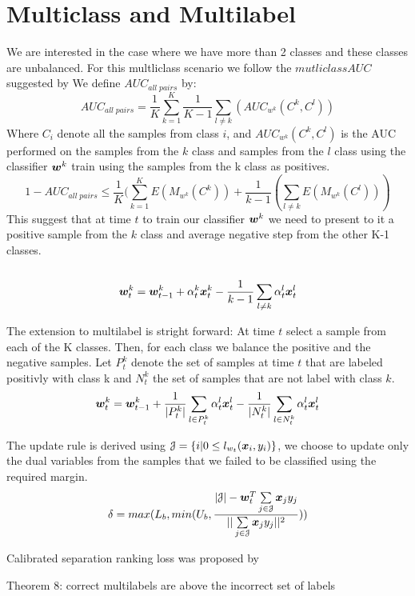 \section{Multiclass and  Multilabel }

We are interested in the case where we have more than 2 classes and these classes are unbalanced. For this multliclass scenario we follow the $mutliclass AUC$ suggested by \cite{Hand2001}  
We define $AUC_{all \; pairs}$ by:
\[
	AUC_{all \; pairs} = \frac{1}{K} \sum\limits_{k=1}^{K}  \frac{1}{K-1}\sum\limits_{l \neq k} (AUC_{w^k}(C^k, C^l)) 
\]
Where $C_i$ denote all the samples from class $i$, and $AUC_{w^k}(C^k, C^l)$ is the AUC performed on the samples from the $k$ class and samples from the $l$ class using the classifier $ \bm{w}^k $ train using the samples from the k class as positives.
\[
1 - AUC_{all \; pairs} \leq \frac{1}{K} ( \sum\limits_{k=1}^{K} E(M_{w^k}(C^k)) + \frac{1}{k-1} ( \sum\limits_{l \neq k}  E(M_{w^k}(C^l)) )
\]
This suggest that at time $t$ to train our classifier $\bm{w}^k $ we need to present to it a positive sample from the $k$ class and average negative step from the other K-1 classes.\\
\\
\[
  \bm{w}^k_t = \bm{w}^k_{t-1} + \alpha^k_t \bm{x}^k_t - \frac{1}{k-1}\sum\limits_{l \neq k} \alpha^l_t \bm{x}^l_t
\]

The extension to multilabel is stright forward: At time $t$ select a sample from each of the K classes. Then, for each class we balance the positive and the negative samples. Let $P^k_t$ denote the set of samples at time $t$ that are labeled positivly with class k and $N^k_t$ the set of samples that are not label with class $k$.
\\
\[
  \bm{w}^k_t = \bm{w}^k_{t-1} + \frac{1}{|P^k_t|} \sum\limits_{l \in P^k_t} \alpha^l_t \bm{x}^l_t - \frac{1}{|N^k_t|}\sum\limits_{l \in N^k_t} \alpha^l_t \bm{x}^l_t
\]

The update rule is derived using $\mathcal{J} = \{ i | 0 \leq l_{w_t}(\bm{x}_i, y_i) \}$, we choose to update only the dual variables from the samples that we failed to be classified using the required margin.
\\

\[ \delta = max(L_b   , min(U_b , \frac{|\mathcal{J}| - \bm{w}_t^T \sum\limits_{j \in \mathcal{J}} {\bm{x}_j y_j}   }{|| \sum\limits_{j \in \mathcal{J} }{\bm{x}_j y_j} ||^2 }  ) )
\]

Calibrated separation ranking loss was proposed by \cite{YuhongGuo}

Theorem 8: correct multilabels are above the incorrect set of labels
